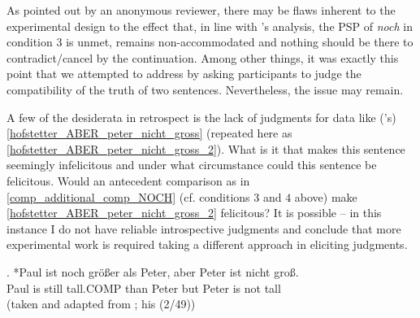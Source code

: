\documentclass[output=paper,
modfonts
]{langscibook}
\begin{document}
As pointed out by an anonymous reviewer, there may be flaws inherent to the experimental design to the effect that, in line with \citeauthor{Hofstetter2013}'s analysis, the PSP of \textit{noch} in condition $3$ is unmet, remains non-accommodated and nothing should be there to contradict/cancel by the continuation. Among other things, it was exactly this point that we attempted to address by asking participants to judge the compatibility of the truth of two sentences. Nevertheless, the issue may remain.

A few of the desiderata in retrospect is the lack of judgments for data like (\citeauthor{Hofstetter2013}'s) \ref{hofstetter_ABER_peter_nicht_gross} (repeated here as \ref{hofstetter_ABER_peter_nicht_gross_2}). What is it that makes this sentence seemingly infelicitous and under what circumstance could this sentence be felicitous. Would an antecedent comparison as in \ref{comp_additional_comp_NOCH} (cf. conditions $3$ and $4$ above) make \ref{hofstetter_ABER_peter_nicht_gross_2} felicitous? It is possible -- in this instance I do not have reliable introspective judgments and conclude that more experimental work is required taking a different approach in eliciting judgments. %




\exg. *Paul ist noch größer als Peter, aber Peter ist nicht groß.\\
Paul is still tall.COMP than Peter but Peter is not tall\\
\flushright\vspace{-9pt} (taken and adapted from \citealt[p.27]{Hofstetter2013}; his (2/49))\label{hofstetter_ABER_peter_nicht_gross_2}
\end{document}
